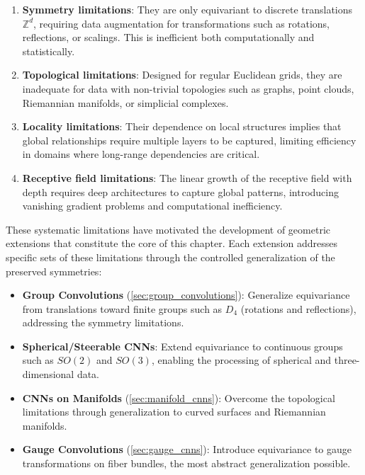 \begin{enumerate}
    \item \textbf{Symmetry limitations}: They are only equivariant to discrete translations $\mathbb{Z}^d$, requiring data augmentation for transformations such as rotations, reflections, or scalings. This is inefficient both computationally and statistically.

    \item \textbf{Topological limitations}: Designed for regular Euclidean grids, they are inadequate for data with non-trivial topologies such as graphs, point clouds, Riemannian manifolds, or simplicial complexes.

    \item \textbf{Locality limitations}: Their dependence on local structures implies that global relationships require multiple layers to be captured, limiting efficiency in domains where long-range dependencies are critical.

    \item \textbf{Receptive field limitations}: The linear growth of the receptive field with depth requires deep architectures to capture global patterns, introducing vanishing gradient problems and computational inefficiency.
\end{enumerate}

These systematic limitations have motivated the development of geometric extensions that constitute the core of this chapter. Each extension addresses specific sets of these limitations through the controlled generalization of the preserved symmetries:

\begin{itemize}
    \item \textbf{Group Convolutions} (\autoref{sec:group_convolutions}): Generalize equivariance from translations toward finite groups such as $D_4$ (rotations and reflections), addressing the symmetry limitations.
    \item \textbf{Spherical/Steerable \glspl{CNN}}: Extend equivariance to continuous groups such as $SO(2)$ and $SO(3)$, enabling the processing of spherical and three-dimensional data.
    \item \textbf{\glspl{CNN} on Manifolds} (\autoref{sec:manifold_cnns}): Overcome the topological limitations through generalization to curved surfaces and Riemannian manifolds.
    \item \textbf{Gauge Convolutions} (\autoref{sec:gauge_cnns}): Introduce equivariance to gauge transformations on fiber bundles, the most abstract generalization possible.
\end{itemize}

